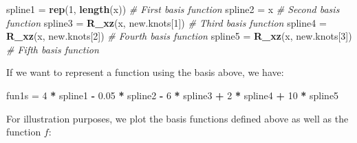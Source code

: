 \documentclass[
]{book}
\newenvironment{Shaded}{\begin{snugshade}}{\end{snugshade}}
\newcommand{\CommentTok}[1]{\textcolor[rgb]{0.56,0.35,0.01}{\textit{#1}}}
\newcommand{\DecValTok}[1]{\textcolor[rgb]{0.00,0.00,0.81}{#1}}
\newcommand{\FloatTok}[1]{\textcolor[rgb]{0.00,0.00,0.81}{#1}}
\newcommand{\FunctionTok}[1]{\textcolor[rgb]{0.13,0.29,0.53}{\textbf{#1}}}
\newcommand{\NormalTok}[1]{#1}
\newcommand{\OtherTok}[1]{\textcolor[rgb]{0.56,0.35,0.01}{#1}}
\newcommand{\SpecialCharTok}[1]{\textcolor[rgb]{0.81,0.36,0.00}{\textbf{#1}}}
\begin{document}
\begin{Shaded}
\begin{Highlighting}[]
\NormalTok{spline1 }\OtherTok{=} \FunctionTok{rep}\NormalTok{(}\DecValTok{1}\NormalTok{, }\FunctionTok{length}\NormalTok{(x))  }\CommentTok{\# First basis function}
\NormalTok{spline2 }\OtherTok{=}\NormalTok{ x  }\CommentTok{\# Second basis function}
\NormalTok{spline3 }\OtherTok{=} \FunctionTok{R\_xz}\NormalTok{(x, new.knots[}\DecValTok{1}\NormalTok{])  }\CommentTok{\# Third basis function }
\NormalTok{spline4 }\OtherTok{=} \FunctionTok{R\_xz}\NormalTok{(x, new.knots[}\DecValTok{2}\NormalTok{])  }\CommentTok{\# Fourth basis function }
\NormalTok{spline5 }\OtherTok{=} \FunctionTok{R\_xz}\NormalTok{(x, new.knots[}\DecValTok{3}\NormalTok{])  }\CommentTok{\# Fifth basis function }
\end{Highlighting}
\end{Shaded}

If we want to represent a function using the basis above, we have:

\begin{Shaded}
\begin{Highlighting}[]
\NormalTok{fun1s }\OtherTok{=} \DecValTok{4} \SpecialCharTok{*}\NormalTok{ spline1 }\SpecialCharTok{{-}} \FloatTok{0.05} \SpecialCharTok{*}\NormalTok{ spline2 }\SpecialCharTok{{-}} \DecValTok{6} \SpecialCharTok{*}\NormalTok{ spline3 }\SpecialCharTok{+} \DecValTok{2} \SpecialCharTok{*}\NormalTok{ spline4 }\SpecialCharTok{+}
    \DecValTok{10} \SpecialCharTok{*}\NormalTok{ spline5}
\end{Highlighting}
\end{Shaded}

For illustration purposes, we plot the basis functions defined above as well as the function \(f\):
\end{document}
